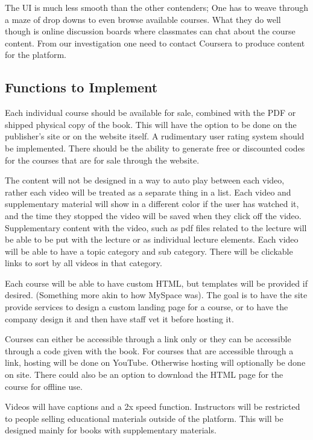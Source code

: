 \documentclass{article}
\begin{document}
The UI is much less smooth than the other contenders; One has to weave through
a maze of drop downs to even browse available courses. What they do well though
is online discussion boards where classmates can chat about the course content.
From our investigation one need to contact Coursera to produce content for the
platform.

\subsection{Functions to Implement}

Each individual course should be available for sale, combined with the PDF or shipped physical copy of the book. This will have the option to be done on the publisher's site or on the website itself. A rudimentary user rating system should be implemented. There should be the ability to generate free or discounted codes for the courses that are for sale through the website.

The content will not be designed in a way to auto play between each video, rather each video will be treated as a separate thing in a list. Each video and supplementary material will show in a different color if the user has watched it, and the time they stopped the video will be saved when they click off the video. Supplementary content with the video, such as pdf files related to the lecture will be able to be put with the lecture or as individual lecture elements. Each video will be able to have a topic category and sub category. There will be clickable links to sort by all videos in that category.

Each course will be able to have custom HTML, but templates will be provided if desired. (Something more akin to how MySpace was). The goal is to have the site provide services to design a custom landing page for a course, or to have the company design it and then have staff vet it before hosting it.

Courses can either be accessible through a link only or they can be accessible through a code given with the book. For courses that are accessible through a link, hosting will be done on YouTube. Otherwise hosting will optionally be done on site. There could also be an option to download the HTML page for the course for offline use.

Videos will have captions and a 2x speed function. Instructors will be restricted to people selling educational materials outside of the platform. This will be designed mainly for books with supplementary materials.
\end{document}

